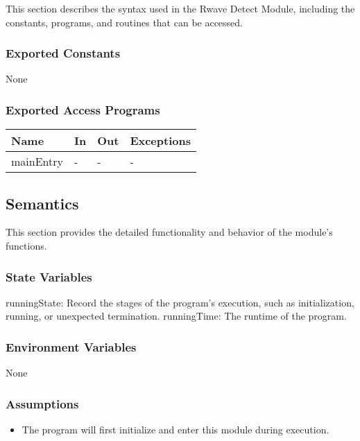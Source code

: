 \documentclass[12pt, titlepage]{article}
\begin{document}
This section describes the syntax used in the Rwave Detect Module, including the
constants, programs, and routines that can be accessed.

\subsubsection{Exported Constants}

None

\subsubsection{Exported Access Programs}

\begin{center}
\begin{tabular}{p{2cm} p{4cm} p{4cm} p{2cm}}
\hline
\textbf{Name} & \textbf{In} & \textbf{Out} & \textbf{Exceptions} \\
\hline
mainEntry & - & - & - \\
\hline
\end{tabular}
\end{center}

\subsection{Semantics}

This section provides the detailed functionality and behavior of the module’s
functions.

\subsubsection{State Variables}

runningState: Record the stages of the program's execution, such as
initialization, running, or unexpected termination.  runningTime: The runtime of
the program.

\subsubsection{Environment Variables}

None

\subsubsection{Assumptions}

\begin{itemize}
\item The program will first initialize and enter this module during execution.
\end{itemize}
\end{document}

